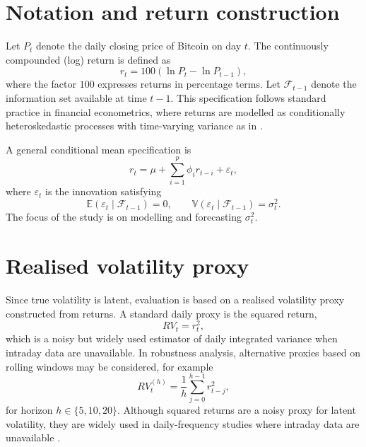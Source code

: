 \documentclass[12pt]{report}
\begin{document}
\section{Notation and return construction}

Let $P_t$ denote the daily closing price of Bitcoin on day $t$. The continuously compounded (log) return is defined as
\begin{equation}
r_t = 100\left(\ln P_t - \ln P_{t-1}\right),
\end{equation}
where the factor $100$ expresses returns in percentage terms. Let $\mathcal{F}_{t-1}$ denote the information set available at time $t-1$. This specification follows standard practice in financial econometrics, where returns are modelled as conditionally heteroskedastic processes with time-varying variance as in \cite{bollerslev1986garch}.

A general conditional mean specification is
\begin{equation}
r_t = \mu + \sum_{i=1}^{p}\phi_i r_{t-i} + \varepsilon_t,
\end{equation}
where $\varepsilon_t$ is the innovation satisfying
\begin{equation}
\mathbb{E}(\varepsilon_t \mid \mathcal{F}_{t-1}) = 0, 
\qquad 
\mathbb{V}(\varepsilon_t \mid \mathcal{F}_{t-1}) = \sigma_t^2.
\end{equation}
The focus of the study is on modelling and forecasting $\sigma_t^2$.

\section{Realised volatility proxy}

Since true volatility is latent, evaluation is based on a realised volatility proxy constructed from returns. A standard daily proxy is the squared return,
\begin{equation}
RV_t = r_t^2,
\end{equation}
which is a noisy but widely used estimator of daily integrated variance when intraday data are unavailable. In robustness analysis, alternative proxies based on rolling windows may be considered, for example
\begin{equation}
RV^{(h)}_t = \frac{1}{h}\sum_{j=0}^{h-1} r_{t-j}^2,
\end{equation}
for horizon $h \in \{5,10,20\}$.
Although squared returns are a noisy proxy for latent volatility, they are widely used in daily-frequency studies where intraday data are unavailable \citep{andersen1998answer, patton2011volatility}.
\end{document}
